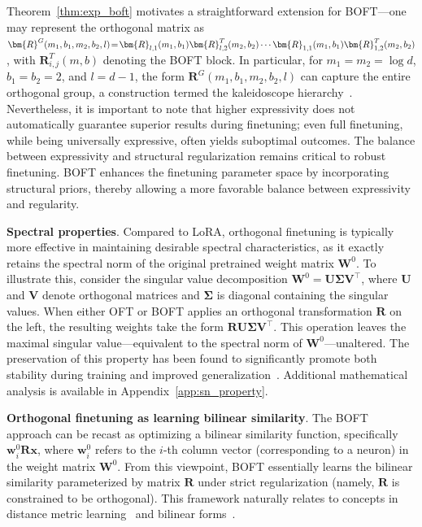 Theorem~\ref{thm:exp_boft} motivates a straightforward extension for BOFT—one may represent the orthogonal matrix as $\thickmuskip=2mu \medmuskip=2mu \bm{R}^G(m_1,b_1,m_2,b_2,l)=\bm{R}_{l,1}(m_1,b_1)\bm{R}_{l,2}^T(m_2,b_2)\cdots\bm{R}_{1,1}(m_1,b_1)\bm{R}_{1,2}^T(m_2,b_2)$, with $\bm{R}_{i,j}^T(m,b)$ denoting the BOFT block. In particular, for $m_1=m_2=\log d$, $b_1=b_2=2$, and $l=d-1$, the form $\bm{R}^G(m_1,b_1,m_2,b_2,l)$ can capture the entire orthogonal group, a construction termed the kaleidoscope hierarchy~\cite{dao2019kaleidoscope}. Nevertheless, it is important to note that higher expressivity does not automatically guarantee superior results during finetuning; even full finetuning, while being universally expressive, often yields suboptimal outcomes. The balance between expressivity and structural regularization remains critical to robust finetuning. BOFT enhances the finetuning parameter space by incorporating structural priors, thereby allowing a more favorable balance between expressivity and regularity.

\textbf{Spectral properties}. Compared to LoRA, orthogonal finetuning is typically more effective in maintaining desirable spectral characteristics, as it exactly retains the spectral norm of the original pretrained weight matrix $\bm{W}^0$. To illustrate this, consider the singular value decomposition $\bm{W}^0=\bm{U}\bm{\Sigma}\bm{V}^\top$, where $\bm{U}$ and $\bm{V}$ denote orthogonal matrices and $\bm{\Sigma}$ is diagonal containing the singular values. When either OFT or BOFT applies an orthogonal transformation $\bm{R}$ on the left, the resulting weights take the form $\bm{R}\bm{U}\bm{\Sigma}\bm{V}^\top$. This operation leaves the maximal singular value—equivalent to the spectral norm of $\bm{W}^0$—unaltered. The preservation of this property has been found to significantly promote both stability during training and improved generalization~\cite{miyato2018spectral,yoshida2017spectral}. Additional mathematical analysis is available in Appendix~\ref{app:sn_property}.

\textbf{Orthogonal finetuning as learning bilinear similarity}. The BOFT approach can be recast as optimizing a bilinear similarity function, specifically $\bm{w}^0_i\bm{R}\bm{x}$, where $\bm{w}^0_i$ refers to the $i$-th column vector (corresponding to a neuron) in the weight matrix $\bm{W}^0$. From this viewpoint, BOFT essentially learns the bilinear similarity parameterized by matrix $\bm{R}$ under strict regularization (namely, $\bm{R}$ is constrained to be orthogonal). This framework naturally relates to concepts in distance metric learning~\cite{xing2002distance} and bilinear forms~\cite{roman2005advanced}.


